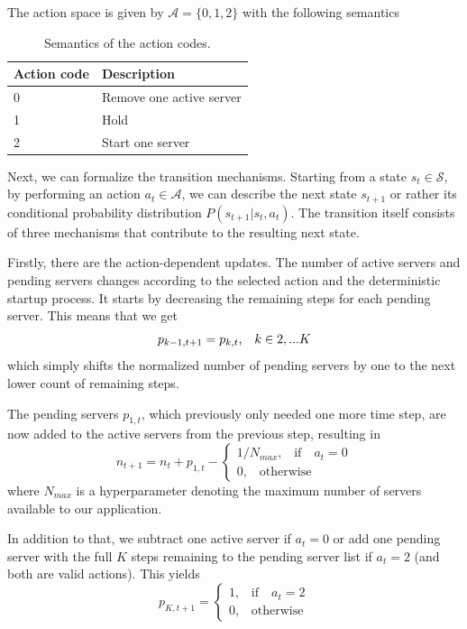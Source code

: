 \documentclass[a4paper,11pt]{article}
\begin{document}
\noindent
The action space is given by $\mathcal{A} = \{0,1,2\}$ with the following semantics
\begin{table}[H]
    \centering
    \begin{tabular}{ll}
        \hline
        \textbf{Action code} & \textbf{Description} \\
        \hline
        0 & Remove one active server \\
        1 & Hold \\
        2 & Start one server \\
        \hline
    \end{tabular}
    \caption{Semantics of the action codes.}
    \label{tab:action_codes}
\end{table}

Next, we can formalize the transition mechanisms. Starting from a state $s_t \in \mathcal{S}$, by performing an action $a_t \in \mathcal{A}$, we can describe the next state $s_{t+1}$ or rather its conditional probability distribution $P(s_{t+1}|s_t,a_t)$.
The transition itself consists of three mechanisms that contribute to the resulting next state.

Firstly, there are the action-dependent updates. The number of active servers and pending servers changes according to the selected action and the deterministic startup process.
It starts by decreasing the remaining steps for each pending server.
This means that we get
\begin{equation*}
    p_{k-1,t+1} = p_{k,t}\text{,}\quad k\in {2, ... K} \\
\end{equation*}
which simply shifts the normalized number of pending servers by one to the next lower count of remaining steps.

The pending servers $p_{1,t}$, which previously only needed one more time step, are now added to the active servers from the previous step, resulting in
\begin{equation*}
    n_{t+1} = n_t + p_{1,t} - \begin{cases}
        1 / N_{max}\text{,}\quad \text{if} \quad a_t=0 \\
        0\text{,}\quad \text{otherwise} 
    \end{cases}
\end{equation*}
where $N_{max}$ is a hyperparameter denoting the maximum number of servers available to our application.

In addition to that, we subtract one active server if $a_t=0$  or add one pending server with the full $K$ steps remaining to the pending server list if $a_t = 2$ (and both are valid actions).
This yields
\begin{equation*}
    p_{K,t+1} = \begin{cases}
        1\text{,}\quad \text{if} \quad a_t=2 \\
        0\text{,}\quad \text{otherwise} 
    \end{cases}
\end{equation*}
\end{document}
